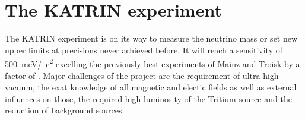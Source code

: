 %

    \chapter{The KATRIN experiment}
    \label{ch:The KATRIN experiment}
    The KATRIN experiment is on its way to measure the neutrino mass or set new upper limits at precisions never achieved before. It will reach a sensitivity of \SI{500}{\milli\electronvolt}/\SI{}{\square c} excelling the previously best experiments of Mainz and Troisk by a factor of . Major challenges of the project are the requirement of ultra high vacuum, the exat knowledge of all magnetic and electic fields as well as external influences on those, the required high luminosity of the Tritium source and the reduction of background sources.
